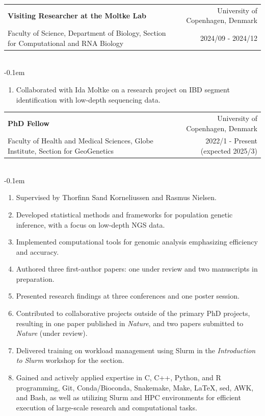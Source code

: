 \documentclass[letterpaper,10.5pt]{article}
\makeatletter
\newcommand{\cvSubheading}[5]{
  \vspace{-1pt}\item
    \begin{tabular*}{0.97\textwidth}{l@{\extracolsep{\fill}}r}
      \textbf{#1} & #2 \\
      {\small#3} & {\small #4} \\
    \end{tabular*}\vspace{3pt} \\
    #5
}
\makeatother
\begin{document}
         \cvSubheading
        {Visiting Researcher at the Moltke Lab}
        {University of Copenhagen, Denmark}
        {Faculty of Science, Department of Biology, Section for Computational and RNA Biology}
        {2024/09 - 2024/12}
          \vspace{-0.1em} \begin{enumerate}[label=\textbf{-},nosep,wide,  labelindent=0pt]
        \item Collaborated with Ida Moltke on a research project on IBD segment identification with low-depth sequencing data.
    \end{enumerate}
\vspace{0.4em}
        \cvSubheading
        {PhD Fellow}
        {University of Copenhagen, Denmark}
        {Faculty of Health and Medical Sciences, Globe Institute, Section for GeoGenetics}
        {2022/1 - Present (expected 2025/3)}
            \vspace{-0.1em} \begin{enumerate}[label=\textbf{-},nosep,wide,  labelindent=0pt]
        \item Supervised by Thorfinn Sand Korneliussen and Rasmus Nielsen.
        \item Developed statistical methods and frameworks for population genetic inference, with a focus on low-depth NGS data.
        \item Implemented computational tools for genomic analysis emphasizing efficiency and accuracy.
        \item Authored three first-author papers: one under review and two manuscripts in preparation.
        \item Presented research findings at three conferences and one poster session.
        \item Contributed to collaborative projects outside of the primary PhD projects, resulting in one paper published in \textit{Nature}, and two papers submitted to \textit{Nature} (under review).
        \item Delivered training on workload management using Slurm in the \textit{Introduction to Slurm} workshop for the section.
        \item Gained and actively applied expertise in C, C++, Python, and R programming, Git, Conda/Bioconda, Snakemake, Make, \LaTeX, sed, AWK, and Bash, as well as utilizing Slurm and HPC environments for efficient execution of large-scale research and computational tasks.

      \end{enumerate}
    \medskip
  
\end{document}
